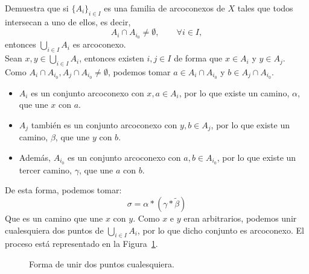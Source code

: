 \begin{ejercicio}
    Demuestra que si $\{A_i\}_{i \in I}$ es una familia de arcoconexos de $X$ tales que todos intersecan a uno de ellos, es decir,
    \begin{equation*}
        A_i\cap A_{i_0} \neq \emptyset, \qquad \forall i \in I,
    \end{equation*}
    entonces $\bigcup\limits_{i \in I}A_i$ es arcoconexo.\\

    \noindent
    Sean $x,y\in \bigcup\limits_{i \in I}A_i$, entonces existen $i,j\in I$ de forma que $x\in A_i$ y $y\in A_j$. Como $A_i \cap A_{i_0}, A_j\cap A_{i_0}\neq \emptyset $, podemos tomar $a\in A_i\cap A_{i_0}$ y $b\in A_j\cap A_{i_0}$.
    \begin{itemize}
        \item $A_i$ es un conjunto arcoconexo con $x,a\in A_i$, por lo que existe un camino, $\alpha$, que une $x$ con $a$.
        \item $A_j$ también es un conjunto arcoconexo con $y,b\in A_j$, por lo que existe un camino, $\beta$, que une $y$ con $b$.
        \item Además, $A_{i_0}$ es un conjunto arcoconexo con $a,b\in A_{i_0}$, por lo que existe un tercer camino, $\gamma$, que une $a$ con $b$.
    \end{itemize}
    De esta forma, podemos tomar:
    \begin{equation*}
        \sigma = \alpha \ast \left(\gamma \ast \tilde{\beta}\right)
    \end{equation*}
    Que es un camino que une $x$ con $y$. Como $x$ e $y$ eran arbitrarios, podemos unir cualesquiera dos puntos de $\bigcup\limits_{i \in I}A_i$, por lo que dicho conjunto es arcoconexo. El proceso está representado en la Figura~\ref{fig:union_arcoconexos}.

    \begin{figure}
        \centering
        \caption{Forma de unir dos puntos cualesquiera.}
        \label{fig:union_arcoconexos}
    \end{figure}
\end{ejercicio}


